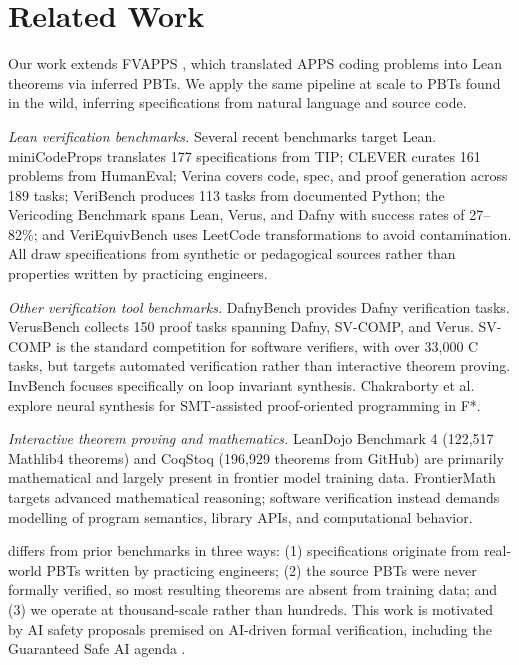 \section{Related Work}
Our work extends FVAPPS \cite{dougherty2025proving}, which translated APPS \cite{hendrycks2021apps} coding problems into Lean theorems via inferred PBTs. We apply the same pipeline at scale to PBTs found in the wild, inferring specifications from natural language and source code.

\emph{Lean verification benchmarks.}
Several recent benchmarks target Lean. miniCodeProps \cite{brandfonbrener2024minicodeprops} translates 177 specifications from TIP; CLEVER \cite{thakur2025clever} curates 161 problems from HumanEval; Verina \cite{wu2025verina} covers code, spec, and proof generation across 189 tasks; VeriBench \cite{stechly2025veribench} produces 113 tasks from documented Python; the Vericoding Benchmark \cite{bursuc2025benchmark} spans Lean, Verus, and Dafny with success rates of 27--82\%; and VeriEquivBench \cite{ma2025veriequivbench} uses LeetCode transformations to avoid contamination. All draw specifications from synthetic or pedagogical sources rather than properties written by practicing engineers.

\emph{Other verification tool benchmarks.}
DafnyBench \cite{loughridge2024dafnybench} provides Dafny verification tasks. VerusBench \cite{chen2024verusbench} collects 150 proof tasks spanning Dafny, SV-COMP, and Verus. SV-COMP \cite{beyer2025svcomp} is the standard competition for software verifiers, with over 33{,}000 C tasks, but targets automated verification rather than interactive theorem proving. InvBench \cite{wu2025invbench} focuses specifically on loop invariant synthesis. Chakraborty et al.\ \cite{chakraborty2024neural} explore neural synthesis for SMT-assisted proof-oriented programming in F*.

\emph{Interactive theorem proving and mathematics.}
LeanDojo Benchmark 4 \cite{hsiang2025leandojo} (122{,}517 Mathlib4 theorems) and CoqStoq \cite{thompson2024rango} (196{,}929 theorems from GitHub) are primarily mathematical and largely present in frontier model training data. FrontierMath \cite{glazer2024frontiermath} targets advanced mathematical reasoning; software verification instead demands modelling of program semantics, library APIs, and computational behavior.

\FVSpec differs from prior benchmarks in three ways: (1) specifications originate from real-world PBTs written by practicing engineers; (2) the source PBTs were never formally verified, so most resulting theorems are absent from training data; and (3) we operate at thousand-scale rather than hundreds. This work is motivated by AI safety proposals premised on AI-driven formal verification, including the Guaranteed Safe AI agenda \cite{dalrymple2024guaranteed}.
